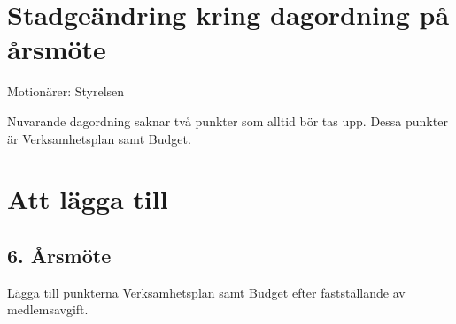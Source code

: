 \documentclass[a4paper,11pt,oneside]{article}
\begin{document}
\section*{Stadgeändring kring dagordning på årsmöte}

Motionärer: Styrelsen

Nuvarande dagordning saknar två punkter som alltid bör tas upp. Dessa punkter är Verksamhetsplan samt Budget.

\section*{Att lägga till}
\subsection*{6. Årsmöte}
Lägga till punkterna Verksamhetsplan samt Budget efter fastställande av medlemsavgift.
\end{document}
